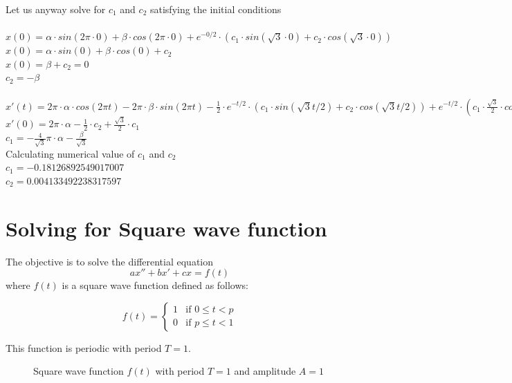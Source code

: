 \documentclass{article}
\begin{document}
\begin{enumerate}
    Let us anyway solve for $c_1$ and $c_2$ satisfying the initial conditions\\\\
    $x(0) = \alpha \cdot sin(2\pi \cdot 0) + \beta \cdot cos(2\pi \cdot 0) + e^{-0/2} \cdot (c_1 \cdot sin(\sqrt{3} \cdot 0) + c_2 \cdot cos(\sqrt{3} \cdot 0))$\\
    $x(0) = \alpha \cdot sin(0) + \beta \cdot cos(0) + c_2$\\
    $x(0) = \beta + c_2 = 0$\\
    $c_2 = -\beta$\\\\
    $x'(t) = 2\pi \cdot \alpha \cdot cos(2\pi t) - 2\pi \cdot \beta \cdot sin(2\pi t) - \frac{1}{2} \cdot e^{-t/2} \cdot (c_1 \cdot sin(\sqrt{3}t/2) + c_2 \cdot cos(\sqrt{3}t/2)) + e^{-t/2} \cdot (c_1 \cdot \frac{\sqrt{3}}{2} \cdot cos(\sqrt{3}t/2) - c_2 \cdot \frac{\sqrt{3}}{2} \cdot sin(\sqrt{3}t/2))$\\
    $x'(0) = 2\pi \cdot \alpha - \frac{1}{2} \cdot c_2 + \frac{\sqrt{3}}{2} \cdot c_1$\\
    $c_1 = -\frac{4}{\sqrt{3}}\pi \cdot \alpha - \frac{\beta}{\sqrt{3}}$\\
    Calculating numerical value of $c_1$ and $c_2$\\
    $c_1 = -0.18126892549017007$\\
    $c_2 = 0.004133492238317597$\\
\end{enumerate}

\section{Solving for Square wave function}

The objective is to solve the differential equation
\[ ax'' + bx' + cx = f(t) \]
where \( f(t) \) is a square wave function defined as follows:

\[
f(t) =
\begin{cases}
1 & \text{if } 0 \leq t < p \\
0 & \text{if } p \leq t < 1
\end{cases}
\]

This function is periodic with period \( T = 1 \).

\begin{figure}[h]
\centering
{}
\caption{Square wave function \( f(t) \) with period \( T=1 \) and amplitude \( A=1 \)}
\label{fig:square_wave}
\end{figure}
\end{document}
